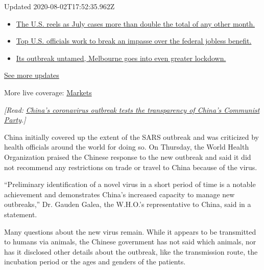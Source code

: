 Updated 2020-08-02T17:52:35.962Z

\begin{itemize}
\tightlist
\item
  \href{https://www.nytimes.com/2020/08/01/world/coronavirus-covid-19.html?action=click\&pgtype=Article\&state=default\&region=MAIN_CONTENT_1\&context=storylines_live_updates\#link-34047410}{The
  U.S. reels as July cases more than double the total of any other
  month.}
\item
  \href{https://www.nytimes.com/2020/08/01/world/coronavirus-covid-19.html?action=click\&pgtype=Article\&state=default\&region=MAIN_CONTENT_1\&context=storylines_live_updates\#link-780ec966}{Top
  U.S. officials work to break an impasse over the federal jobless
  benefit.}
\item
  \href{https://www.nytimes.com/2020/08/01/world/coronavirus-covid-19.html?action=click\&pgtype=Article\&state=default\&region=MAIN_CONTENT_1\&context=storylines_live_updates\#link-2bc8948}{Its
  outbreak untamed, Melbourne goes into even greater lockdown.}
\end{itemize}

\href{https://www.nytimes.com/2020/08/01/world/coronavirus-covid-19.html?action=click\&pgtype=Article\&state=default\&region=MAIN_CONTENT_1\&context=storylines_live_updates}{See
more updates}

More live coverage:
\href{https://www.nytimes.com/live/2020/07/31/business/stock-market-today-coronavirus?action=click\&pgtype=Article\&state=default\&region=MAIN_CONTENT_1\&context=storylines_live_updates}{Markets}

\emph{{[}Read:}
\href{https://www.nytimes.com/2020/01/21/world/asia/china-coronavirus-australia-wuhan-travel.html}{\emph{China's
coronavirus outbreak tests the transparency of China's Communist
Party}}\emph{.{]}}

China initially covered up the extent of the SARS outbreak and was
criticized by health officials around the world for doing so. On
Thursday, the World Health Organization praised the Chinese response to
the new outbreak and said it did not recommend any restrictions on trade
or travel to China because of the virus.

``Preliminary identification of a novel virus in a short period of time
is a notable achievement and demonstrates China's increased capacity to
manage new outbreaks,'' Dr. Gauden Galea, the W.H.O.'s representative to
China, said in a statement.

Many questions about the new virus remain. While it appears to be
transmitted to humans via animals, the Chinese government has not said
which animals, nor has it disclosed other details about the outbreak,
like the transmission route, the incubation period or the ages and
genders of the patients.

